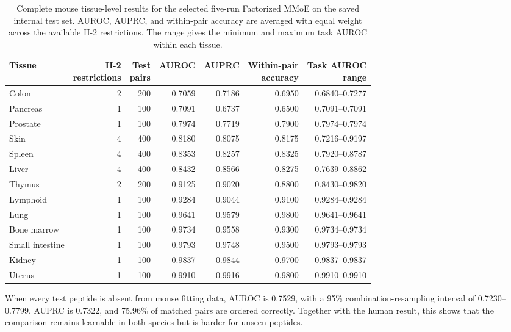 \begin{table}[!t]
\centering
\caption{Complete mouse tissue-level results for the selected five-run Factorized MMoE on the saved internal test set. AUROC, AUPRC, and within-pair accuracy are averaged with equal weight across the available H-2 restrictions. The range gives the minimum and maximum task AUROC within each tissue.}
\label{tab:mouse-tissue-complete}
\fontsize{7.5}{8.5}\selectfont
\setlength{\tabcolsep}{3pt}
\begin{tabularx}{\textwidth}{@{}>{\raggedright\arraybackslash}Xrrrrrr@{}}
\toprule
Tissue & \shortstack{H-2\\restrictions} & \shortstack{Test\\pairs} & AUROC & AUPRC & \shortstack{Within-pair\\accuracy} & \shortstack{Task AUROC\\range} \\
\midrule
Colon & 2 & 200 & 0.7059 & 0.7186 & 0.6950 & 0.6840--0.7277 \\
Pancreas & 1 & 100 & 0.7091 & 0.6737 & 0.6500 & 0.7091--0.7091 \\
Prostate & 1 & 100 & 0.7974 & 0.7719 & 0.7900 & 0.7974--0.7974 \\
Skin & 4 & 400 & 0.8180 & 0.8075 & 0.8175 & 0.7216--0.9197 \\
Spleen & 4 & 400 & 0.8353 & 0.8257 & 0.8325 & 0.7920--0.8787 \\
Liver & 4 & 400 & 0.8432 & 0.8566 & 0.8275 & 0.7639--0.8862 \\
Thymus & 2 & 200 & 0.9125 & 0.9020 & 0.8800 & 0.8430--0.9820 \\
Lymphoid & 1 & 100 & 0.9284 & 0.9044 & 0.9100 & 0.9284--0.9284 \\
Lung & 1 & 100 & 0.9641 & 0.9579 & 0.9800 & 0.9641--0.9641 \\
Bone marrow & 1 & 100 & 0.9734 & 0.9558 & 0.9300 & 0.9734--0.9734 \\
Small intestine & 1 & 100 & 0.9793 & 0.9748 & 0.9500 & 0.9793--0.9793 \\
Kidney & 1 & 100 & 0.9837 & 0.9844 & 0.9700 & 0.9837--0.9837 \\
Uterus & 1 & 100 & 0.9910 & 0.9916 & 0.9800 & 0.9910--0.9910 \\
\bottomrule
\end{tabularx}
\end{table}

When every test peptide is absent from mouse fitting data, AUROC is 0.7529, with a 95\% combination-resampling interval of 0.7230--0.7799. AUPRC is 0.7322, and 75.96\% of matched pairs are ordered correctly. Together with the human result, this shows that the comparison remains learnable in both species but is harder for unseen peptides.

